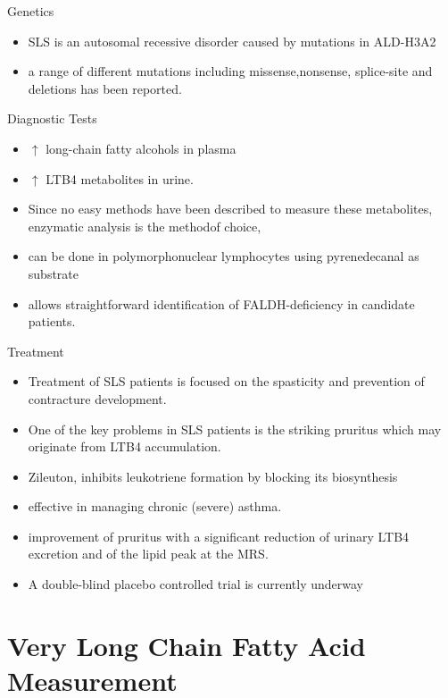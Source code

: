 \documentclass[presentation, smaller]{beamer}
\begin{document}
\begin{frame}[label={sec:org4e4c873}]{Genetics}
\begin{itemize}
\item SLS is an autosomal recessive disorder caused by mutations in
ALD-H3A2
\item a range of different mutations including missense,nonsense,
splice-site and deletions has been reported.
\end{itemize}
\end{frame}


\begin{frame}[label={sec:org5c4f778}]{Diagnostic Tests}
\begin{itemize}
\item \(\uparrow\) long-chain fatty alcohols in plasma
\item \(\uparrow\) LTB4 metabolites in urine.
\item Since no easy methods have been described to measure these
metabolites, enzymatic analysis is the methodof choice,
\item can be done in polymorphonuclear lymphocytes using pyrenedecanal as substrate
\item allows straightforward identification of FALDH-deficiency in candidate patients.
\end{itemize}
\end{frame}

\begin{frame}[label={sec:orga1d7435}]{Treatment}
\begin{itemize}
\item Treatment of SLS patients is focused on the spasticity and prevention of contracture development.
\item One of the key problems in SLS patients is the striking pruritus which may originate from LTB4 accumulation.
\item Zileuton, inhibits leukotriene formation by blocking its biosynthesis
\item effective in managing chronic (severe) asthma.
\item improvement of pruritus with a significant reduction of urinary LTB4
excretion and of the lipid peak at the MRS.
\item A double-blind placebo controlled trial is currently underway
\end{itemize}
\end{frame}

\section{Very Long Chain Fatty Acid Measurement}
\label{sec:org316bc13}
\end{document}
